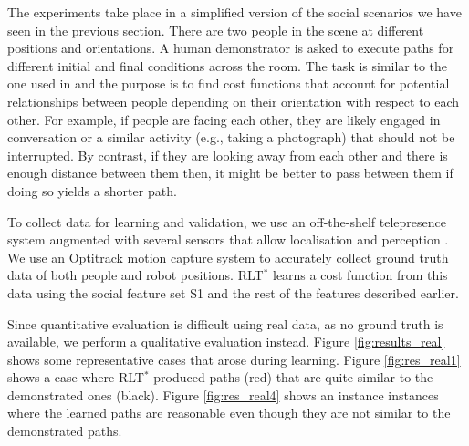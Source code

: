 \documentclass[a4paper,11pt]{report}
\begin{document}
	The experiments take place in a simplified version of the social scenarios we have seen in the previous section. There are two people in the scene at different positions and orientations. A human demonstrator is asked to execute paths for different initial and final conditions across the room. The task is similar to the one used in \cite{okallearning} and the purpose is to find cost functions that account for potential relationships between people depending on their orientation with respect to each other. For example, if people are facing each other, they are  likely engaged in conversation or a similar activity (e.g., taking a photograph) that should not be interrupted. By contrast, if they are looking away from each other and there is enough distance between them then, it might be better to pass between them if doing so yields a shorter path.

	To collect data for learning and validation, we use an off-the-shelf telepresence system augmented with several sensors that allow localisation and perception \cite{shiarlis2015teresa}. We use an Optitrack motion capture system to accurately collect ground truth data of both people and robot positions. RLT$^*$ learns a cost function from this data using the social feature set S1 and the rest of the features described earlier.

Since quantitative evaluation is difficult using real data, as no ground truth is available, we perform a qualitative evaluation instead. Figure \ref{fig:results_real} shows some representative cases that arose during learning. Figure \ref{fig:res_real1} shows a case where RLT$^*$ produced paths (red) that are quite similar to the demonstrated ones (black). Figure \ref{fig:res_real4} shows an instance instances where  the learned paths are reasonable even though they are not similar to the demonstrated paths.
\end{document}

